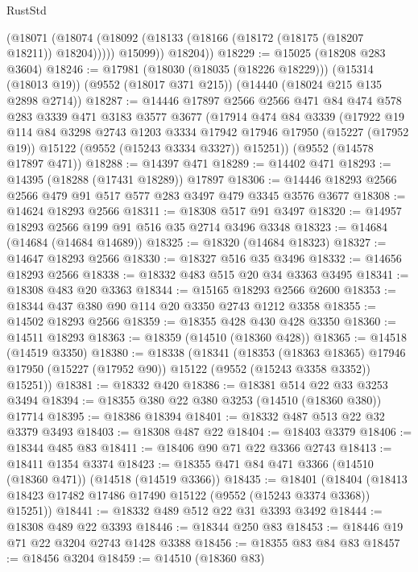 \begin{lexlean}{RustStd}
\begin{coremodule}
          (@18071
            (@18074 (@18092 (@18133 (@18166 (@18172 (@18175 (@18207 @18211)) @18204)))))
            @15099))
        @18204))
@18229 := @15025 (@18208 @283 @3604)
@18246 := @17981
    (@18030 (@18035 (@18226 @18229)))
    (@15314 (@18013 @19))
    (@9552 (@18017 @371 @215))
    (@14440 (@18024 @215 @135 @2898 @2714))
@18287 := @14446
    @17897
    @2566
    @2566
    @471
    @84
    @474
    @578
    @283
    @3339
    @471
    @3183
    @3577
    @3677
    (@17914
      @474
      @84
      @3339
      (@17922
        @19
        @114
        @84
        @3298
        @2743
        @1203
        @3334
        @17942
        @17946
        @17950
        (@15227 (@17952 @19))
        @15122
        (@9552 (@15243 @3334 @3327))
        @15251))
    (@9552 (@14578 @17897 @471))
@18288 := @14397 @471
@18289 := @14402 @471
@18293 := @14395 (@18288 (@17431 @18289)) @17897
@18306 := @14446 @18293 @2566 @2566 @479 @91 @517 @577 @283 @3497 @479 @3345 @3576 @3677
@18308 := @14624 @18293 @2566
@18311 := @18308 @517 @91 @3497
@18320 := @14957 @18293 @2566 @199 @91 @516 @35 @2714 @3496 @3348
@18323 := @14684 (@14684 (@14684 @14689))
@18325 := @18320 (@14684 @18323)
@18327 := @14647 @18293 @2566
@18330 := @18327 @516 @35 @3496
@18332 := @14656 @18293 @2566
@18338 := @18332 @483 @515 @20 @34 @3363 @3495
@18341 := @18308 @483 @20 @3363
@18344 := @15165 @18293 @2566 @2600
@18353 := @18344 @437 @380 @90 @114 @20 @3350 @2743 @1212 @3358
@18355 := @14502 @18293 @2566
@18359 := @18355 @428 @430 @428 @3350
@18360 := @14511 @18293
@18363 := @18359 (@14510 (@18360 @428))
@18365 := @14518 (@14519 @3350)
@18380 := @18338
    (@18341
      (@18353
        (@18363 @18365)
        @17946
        @17950
        (@15227 (@17952 @90))
        @15122
        (@9552 (@15243 @3358 @3352))
        @15251))
@18381 := @18332 @420
@18386 := @18381 @514 @22 @33 @3253 @3494
@18394 := @18355 @380 @22 @380 @3253 (@14510 (@18360 @380)) @17714
@18395 := @18386 @18394
@18401 := @18332 @487 @513 @22 @32 @3379 @3493
@18403 := @18308 @487 @22
@18404 := @18403 @3379
@18406 := @18344 @485 @83
@18411 := @18406 @90 @71 @22 @3366 @2743
@18413 := @18411 @1354 @3374
@18423 := @18355 @471 @84 @471 @3366 (@14510 (@18360 @471)) (@14518 (@14519 @3366))
@18435 := @18401
    (@18404 (@18413 @18423 @17482 @17486 @17490 @15122 (@9552 (@15243 @3374 @3368)) @15251))
@18441 := @18332 @489 @512 @22 @31 @3393 @3492
@18444 := @18308 @489 @22 @3393
@18446 := @18344 @250 @83
@18453 := @18446 @19 @71 @22 @3204 @2743 @1428 @3388
@18456 := @18355 @83 @84 @83
@18457 := @18456 @3204
@18459 := @14510 (@18360 @83)

\end{coremodule}
\end{lexlean}
